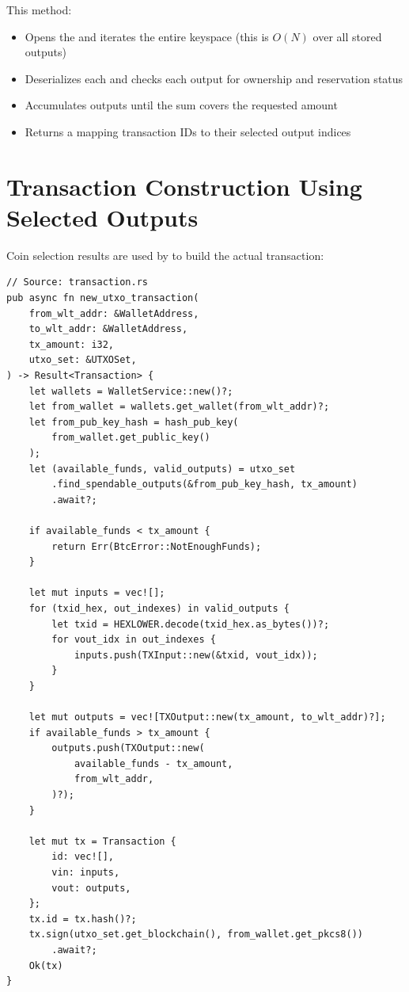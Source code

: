 \begin{checkpointbox}
This method:
\begin{itemize}
  \item Opens the  and iterates the entire keyspace (this is \(O(N)\) over all stored outputs)
  \item Deserializes each  and checks each output for ownership and reservation status
  \item Accumulates outputs until the sum covers the requested amount
  \item Returns a  mapping transaction IDs to their selected output indices
\end{itemize}
\end{checkpointbox}

\section{Transaction Construction Using Selected Outputs}
\label{sec:ch09-4-tx-construction}

Coin selection results are used by  to build the actual transaction:

\begin{listing}[htbp]
\caption{UTXO transaction construction}
\label{lst:ch09-4-5}
\begin{verbatim}
// Source: transaction.rs
pub async fn new_utxo_transaction(
    from_wlt_addr: &WalletAddress,
    to_wlt_addr: &WalletAddress,
    tx_amount: i32,
    utxo_set: &UTXOSet,
) -> Result<Transaction> {
    let wallets = WalletService::new()?;
    let from_wallet = wallets.get_wallet(from_wlt_addr)?;
    let from_pub_key_hash = hash_pub_key(
        from_wallet.get_public_key()
    );
    let (available_funds, valid_outputs) = utxo_set
        .find_spendable_outputs(&from_pub_key_hash, tx_amount)
        .await?;

    if available_funds < tx_amount {
        return Err(BtcError::NotEnoughFunds);
    }

    let mut inputs = vec![];
    for (txid_hex, out_indexes) in valid_outputs {
        let txid = HEXLOWER.decode(txid_hex.as_bytes())?;
        for vout_idx in out_indexes {
            inputs.push(TXInput::new(&txid, vout_idx));
        }
    }

    let mut outputs = vec![TXOutput::new(tx_amount, to_wlt_addr)?];
    if available_funds > tx_amount {
        outputs.push(TXOutput::new(
            available_funds - tx_amount,
            from_wlt_addr,
        )?);
    }

    let mut tx = Transaction {
        id: vec![],
        vin: inputs,
        vout: outputs,
    };
    tx.id = tx.hash()?;
    tx.sign(utxo_set.get_blockchain(), from_wallet.get_pkcs8())
        .await?;
    Ok(tx)
}
\end{verbatim}
\end{listing}

